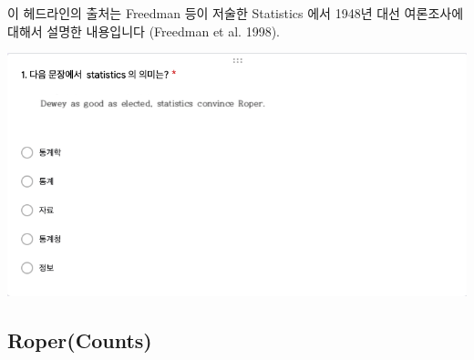 \documentclass[
]{book}
\begin{document}
이 헤드라인의 출처는 Freedman 등이 저술한 Statistics 에서 1948년 대선 여론조사에 대해서 설명한 내용입니다 (Freedman et al. 1998).

\begin{flushleft}\includegraphics[width=1\linewidth]{./pics/Quiz210302_01} \end{flushleft}

\subsection{Roper(Counts)}\label{ropercounts}
\end{document}
